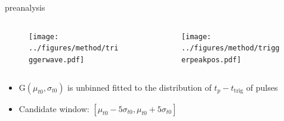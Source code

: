 \documentclass[aspectratio=169]{beamer}
\begin{document}
\begin{frame}{preanalysis}
    \begin{columns}
        \begin{column}{0.6\textwidth}
            \begin{figure}
                \texttt{[image: ../figures/method/triggerwave.pdf]}
            \end{figure}
        \end{column}
        \begin{column}{0.4\textwidth}
            \begin{figure}
                \texttt{[image: ../figures/method/triggerpeakpos.pdf]}
            \end{figure}
        \end{column}
    \end{columns}
    \begin{itemize}
        \item G$(\mu_{t0},\sigma_{t0})$ is unbinned fitted to the distribution of $t_p-t_{\mathrm{trig}}$ of pulses
        \item Candidate window: $[\mu_{t0}-5\sigma_{t0}, \mu_{t0}+5\sigma_{t0}]$
    \end{itemize}
\end{frame}
\end{document}

